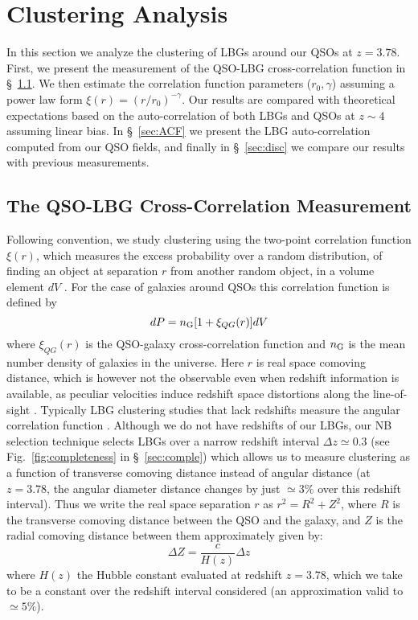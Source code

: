 \documentclass[iop, revtex4]{emulateapj}
\begin{document}
 \section{Clustering Analysis}
 \label{sec:clustering}
 
In this section we analyze the clustering of LBGs around
our QSOs at $z=3.78$. First, we present the measurement of the QSO-LBG
cross-correlation function in \S~\ref{sec:CCF}.
We then estimate the correlation function parameters ($r_{0},\gamma$)
assuming a power law form $\xi(r)=(r/r_{0})^{-\gamma}$. 
Our
results are compared with theoretical expectations based
on the  auto-correlation of both LBGs and QSOs at $z\sim4$ assuming linear bias.  In
\S~\ref{sec:ACF} we present the LBG auto-correlation computed from our QSO fields,
and finally in \S~\ref{sec:disc} we compare our results with previous measurements. 

\subsection{The QSO-LBG Cross-Correlation Measurement}
\label{sec:CCF}

Following convention, we study clustering using the two-point correlation function $\xi(r)$,
which measures the excess probability over a random distribution, of finding an object at separation $r$ from another random object, in a volume element $dV$ \citep{Peebles80}. For the case of galaxies around QSOs
this correlation function is defined by 
\begin{equation}
dP = n_{\rm G} [1+\xi_{QG} (r)]dV
\label{eq:prob}
\end{equation} 
where $\xi_{QG}(r)$ is the QSO-galaxy cross-correlation function and
$n_{\rm G}$ is the mean number density of galaxies in the universe. Here
$r$ is real space comoving distance, which is however not the
observable even when redshift information is available, as peculiar velocities
induce redshift space distortions along the line-of-sight
\citep{Sargent77}. Typically LBG clustering studies that
lack redshifts measure the angular correlation function \citep[e.g.][]{Giavalisco98, Ouchi04b,
  Lee06}. Although we do not have redshifts of our LBGs, our
NB selection technique selects LBGs over a narrow
redshift interval $\Delta z \simeq 0.3$ (see Fig.~\ref{fig:completeness} in \S~\ref{sec:comple})
which allows us to measure clustering as a function of transverse comoving
distance instead of angular distance
(at $z=3.78$, the angular diameter distance changes by just
$\simeq 3\%$ over this redshift interval). 
Thus we write the real space separation $r$ as $r^{2}=R^{2}+Z^{2}$, where
$R$ is the transverse comoving distance between the QSO and the galaxy,
and $Z$ is the radial comoving distance between them approximately given by:
\begin{equation}
\Delta Z=\frac{c}{H(z)} \Delta z
\label{eq:comoving}
\end{equation}
where $H(z)$ the Hubble constant evaluated at redshift $z=3.78$, which we take to be a
constant over the redshift interval considered (an approximation valid to $\simeq 5\%$).  
\end{document}
